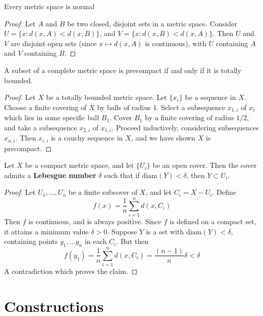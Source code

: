 \begin{theorem}
    Every metric space is normal
\end{theorem}
\begin{proof}
    Let $A$ and $B$ be two closed, disjoint sets in a metric space. Consider $U = \{ x : d(x,A) < d(x,B) \}$, and $V = \{ x : d(x,B) < d(x,A) \}$. Then $U$ and $V$ are disjoint open sets (since $x \mapsto d(x,A)$ is continuous), with $U$ containing $A$ and $V$ containing $B$.
\end{proof}

\begin{theorem}
    A subset of a complete metric space is precompact if and only if it is totally bounded.
\end{theorem}
\begin{proof}
    Let $X$ be a totally bounded metric space. Let $\{ x_i \}$ be a sequence in $X$. Choose a finite covering of $X$ by balls of radius 1. Select a subsequence $x_{1,i}$ of $x_i$ which lies in some specific ball $B_1$. Cover $B_1$ by a finite covering of radius $1/2$, and take a subsequence $x_{2,i}$ of $x_{1,i}$. Proceed inductively, considering subsequences $x_{n,i}$. Then $x_{i,i}$ is a cauchy sequence in $X$, and we have shown $X$ is precompact.
\end{proof}

\begin{theorem}
    Let $X$ be a compact metric space, and let $\{ U_i \}$ be an open cover. Then the cover admits a {\bf Lebesgue number} $\delta$ such that if $\text{diam}(Y) < \delta$, then $Y \subset U_i$.
\end{theorem}
\begin{proof}
    Let $U_1, \dots, U_n$ be a finite subcover of $X$, and let $C_i = X - U_i$. Define
    \[ f(x) = \frac{1}{n} \sum_{i = 1}^n d(x,C_i) \]
    Then $f$ is continuous, and is always positive. Since $f$ is defined on a compact set, it attains a minimum value $\delta > 0$. Suppose $Y$ is a set with $\text{diam}(Y) < \delta$, containing points $y_1, \dots y_n$ in each $C_i$. But then
    \[ f(y_1) = \frac{1}{n} \sum_{i = 1}^n d(x,C_i) = \frac{(n-1)}{n} \delta < \delta \]
    A contradiction which proves the claim.
\end{proof}







\chapter{Constructions}

